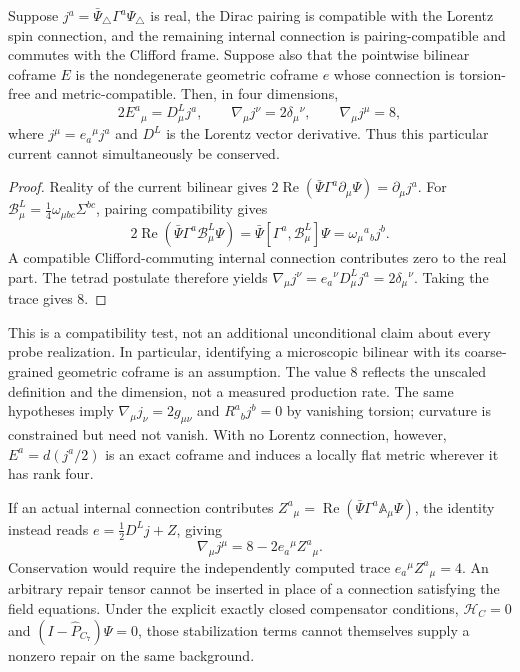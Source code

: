 \begin{proposition}
\label{prop:real-coframe-current-compatibility}
Suppose $j^a=\bar\Psi_\triangle\Gamma^a\Psi_\triangle$ is real,
the Dirac pairing is compatible with the Lorentz spin connection, and
the remaining internal connection is pairing-compatible and commutes
with the Clifford frame. Suppose also that the pointwise bilinear
coframe $E$ is the nondegenerate geometric coframe $e$ whose connection
is torsion-free and metric-compatible. Then, in four dimensions,
\[
  2E^a{}_{\mu}=D^L_\mu j^a,
  \qquad \nabla_\mu j^\nu=2\delta_\mu{}^\nu,
  \qquad \nabla_\mu j^\mu=8,
\]
where $j^\mu=e_a{}^\mu j^a$ and $D^L$ is the Lorentz vector derivative.
Thus this particular current cannot simultaneously be conserved.
\end{proposition}
\begin{proof}
Reality of the current bilinear gives
$2\operatorname{Re}(\bar\Psi\Gamma^a\partial_\mu\Psi)=\partial_\mu j^a$.
For $\mathcal B^L_\mu=\tfrac14\omega_{\mu bc}\Sigma^{bc}$,
pairing compatibility gives
\[
  2\operatorname{Re}(\bar\Psi\Gamma^a\mathcal B^L_\mu\Psi)
  =\bar\Psi[\Gamma^a,\mathcal B^L_\mu]\Psi
  =\omega_\mu{}^a{}_b j^b.
\]
A compatible Clifford-commuting internal connection contributes zero
to the real part. The tetrad postulate therefore yields
$\nabla_\mu j^\nu=e_a{}^\nu D^L_\mu j^a=2\delta_\mu{}^\nu$.
Taking the trace gives $8$.
\end{proof}

This is a compatibility test, not an additional unconditional claim
about every probe realization. In particular, identifying a microscopic
bilinear with its coarse-grained geometric coframe is an assumption.
The value $8$ reflects the unscaled definition and the dimension, not
a measured production rate. The same hypotheses imply
$\nabla_\mu j_\nu=2g_{\mu\nu}$ and $R^a{}_b j^b=0$ by vanishing
torsion; curvature is constrained but need not vanish. With no Lorentz
connection, however, $E^a=d(j^a/2)$ is an exact coframe and induces a
locally flat metric wherever it has rank four.

If an actual internal connection contributes
$Z^a{}_{\mu}=\operatorname{Re}(\bar\Psi\Gamma^a\mathbb A_\mu\Psi)$,
the identity instead reads $e=\tfrac12D^Lj+Z$, giving
\[
  \nabla_\mu j^\mu=8-2e_a{}^\mu Z^a{}_{\mu}.
\]
Conservation would require the independently computed trace
$e_a{}^\mu Z^a{}_{\mu}=4$. An arbitrary repair tensor cannot be
inserted in place of a connection satisfying the field equations.
Under the explicit exactly closed compensator conditions,
$\mathcal H_C=0$ and $(I-\hat P_{C_7})\Psi=0$, those stabilization
terms cannot themselves supply a nonzero repair on the same background.

